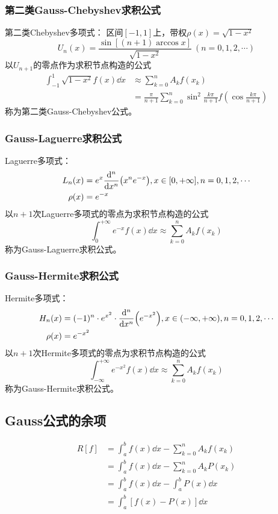 \subsubsection{第二类Gauss-Chebyshev求积公式}

第二类Chebyshev多项式：
区间$[-1,1]$上，带权$\rho(x) = \sqrt{1-x^2}$
\begin{equation*}
    U_n(x) = \frac{\sin[(n+1)\arccos{x}]}{\sqrt{1-x^2}}\    (n=0,1,2,\cdots)
\end{equation*}
以$U_{n+1}$的零点作为求积节点构造的公式
\begin{align*}
    \int_{-1}^{1}\sqrt{1-x^2}f(x)\dd{x} &\approx \sum_{k=0}^{n}A_kf(x_k) \\
    &= \frac{\pi}{n+1}\sum_{k=0}^{n}\sin^2\frac{k\pi}{n+1}f(\cos\frac{k\pi}{n+1})
\end{align*}
称为第二类Gauss-Chebyshev公式。

\subsubsection{Gauss-Laguerre求积公式}
Laguerre多项式：
\begin{align*}
    L_n(x) &= e^x\dv[n]{x}(x^ne^{-x}), x\in [0,+\infty], n=0,1,2,\cdots\\
    \rho(x) &= e^{-x}
\end{align*}
以$n+1$次Laguerre多项式的零点为求积节点构造的公式
\begin{equation*}
    \int_{0}^{+\infty}e^{-x}f(x)\dd{x} \approx \sum_{k=0}^{n}A_kf(x_k)
\end{equation*}
称为Gauss-Laguerre求积公式。

\subsubsection{Gauss-Hermite求积公式}
Hermite多项式：
\begin{align*}
    H_n(x) &= (-1)^n\cdot e^{x^2}\cdot\dv[n]{x}(e^{-x^2}),x\in(-\infty ,+\infty), n = 0,1,2,\cdots\\
    \rho(x) &= e^{-x^2}
\end{align*}
以$n+1$次Hermite多项式的零点为求积节点构造的公式
\begin{equation*}
    \int_{-\infty}^{+\infty}e^{-x^2}f(x)\dd{x} \approx \sum_{k=0}^{n}A_kf(x_k)
\end{equation*}
称为Gauss-Hermite求积公式。

\subsection{Gauss公式的余项}
\begin{align*}
    R[f] &= \int_{a}^{b}f(x)\dd{x} -\sum_{k=0}^{n}A_kf(x_k) \\
    &=\int_{a}^{b}f(x)\dd{x} -\sum_{k=0}^{n}A_kP(x_k) \\
    &= \int_{a}^{b}f(x)\dd{x} - \int_{a}^{b}P(x)\dd{x} \\
    &= \int_{a}^{b}[f(x)-P(x)]\dd{x}
\end{align*}

